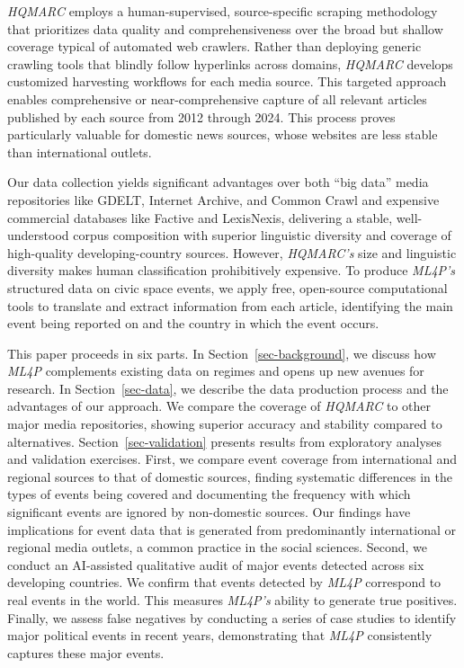 \documentclass[
  letterpaper,
  DIV=11,
  numbers=noendperiod]{scrartcl}
\begin{document}
\emph{HQMARC} employs a human-supervised, source-specific scraping
methodology that prioritizes data quality and comprehensiveness over the
broad but shallow coverage typical of automated web crawlers. Rather
than deploying generic crawling tools that blindly follow hyperlinks
across domains, \emph{HQMARC} develops customized harvesting workflows
for each media source. This targeted approach enables comprehensive or
near-comprehensive capture of all relevant articles published by each
source from 2012 through 2024. This process proves particularly valuable
for domestic news sources, whose websites are less stable than
international outlets.

Our data collection yields significant advantages over both ``big data''
media repositories like GDELT, Internet Archive, and Common Crawl and
expensive commercial databases like Factive and LexisNexis, delivering a
stable, well-understood corpus composition with superior linguistic
diversity and coverage of high-quality developing-country sources.
However, \emph{HQMARC's} size and linguistic diversity makes human
classification prohibitively expensive. To produce \emph{ML4P's}
structured data on civic space events, we apply free, open-source
computational tools to translate and extract information from each
article, identifying the main event being reported on and the country in
which the event occurs.

This paper proceeds in six parts. In Section~\ref{sec-background}, we
discuss how \emph{ML4P} complements existing data on regimes and opens
up new avenues for research. In Section~\ref{sec-data}, we describe the
data production process and the advantages of our approach. We compare
the coverage of \emph{HQMARC} to other major media repositories, showing
superior accuracy and stability compared to alternatives.
Section~\ref{sec-validation} presents results from exploratory analyses
and validation exercises. First, we compare event coverage from
international and regional sources to that of domestic sources, finding
systematic differences in the types of events being covered and
documenting the frequency with which significant events are ignored by
non-domestic sources. Our findings have implications for event data that
is generated from predominantly international or regional media outlets,
a common practice in the social sciences. Second, we conduct an
AI-assisted qualitative audit of major events detected across six
developing countries. We confirm that events detected by \emph{ML4P}
correspond to real events in the world. This measures \emph{ML4P's}
ability to generate true positives. Finally, we assess false negatives
by conducting a series of case studies to identify major political
events in recent years, demonstrating that \emph{ML4P} consistently
captures these major events.
\end{document}
